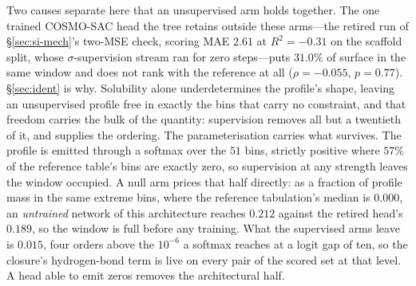 Two causes separate here that an unsupervised arm holds together. The one trained COSMO-SAC head
the tree retains outside these arms---the retired run of \S\ref{sec:si-mech}'s two-MSE check,
scoring MAE $2.61$ at $R^2=-0.31$ on the scaffold split, whose $\sigma$-supervision stream ran for
zero steps---puts $31.0\%$ of surface in the same window and does not rank with the reference at all
($\rho=-0.055$, $p=0.77$). \S\ref{sec:ident} is why. Solubility alone underdetermines the profile's
shape, leaving an unsupervised profile free in exactly the bins that carry no constraint, and that
freedom carries the bulk of the quantity: supervision removes all but a twentieth of it, and
supplies the ordering. The parameterisation carries what survives. The profile is emitted through a
softmax over the $51$ bins, strictly positive where $57\%$ of the reference table's bins are exactly
zero, so supervision at any strength leaves the window occupied. A null arm prices that half
directly: as a fraction of profile mass in the same extreme bins, where the reference tabulation's
median is $0.000$, an \emph{untrained} network of this architecture reaches $0.212$ against the
retired head's $0.189$, so the window is full before any training. What the supervised arms leave is
$0.015$, four orders above the $10^{-6}$ a softmax reaches at a logit gap of ten, so the closure's
hydrogen-bond term is live on every pair of the scored set at that level. A head able to emit zeros
removes the architectural half.
